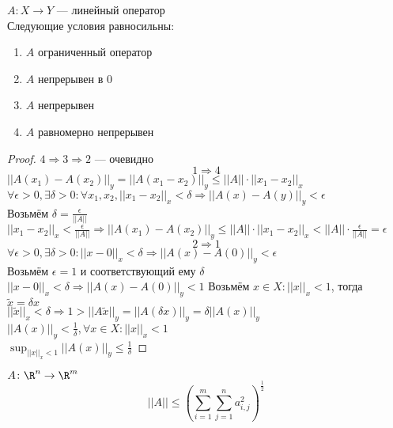 \begin{theorem}
$A \colon X \rightarrow Y$ --- линейный оператор\\
Следующие условия равносильны:
\begin{enumerate}
\item $A$ ограниченный оператор
\item $A$ непрерывен в 0
\item $A$ непрерывен
\item $A$ равномерно непрерывен
\end{enumerate}
\end{theorem}
\begin{proof}
$4\Rightarrow 3 \Rightarrow 2$ --- очевидно\\
\[1 \Rightarrow 4\]
$||A(x_1) - A(x_2)||_y = ||A(x_1 - x_2)||_y \le ||A|| \cdot ||x_1 - x_2||_x$ \\
$\forall \epsilon > 0, \exists \delta > 0 \colon \forall x_1, x_2, ||x_1 - x_2||_x < \delta \Rightarrow ||A(x) - A(y)||_y < \epsilon$ \\
Возьмём $\delta = \frac{\epsilon}{||A||} $\\
$||x_1 - x_2||_x < \frac{\epsilon}{||A||} \Rightarrow ||A(x_1) - A(x_2)||_y \le ||A|| \cdot ||x_1 - x_2||_x < ||A|| \cdot \frac{\epsilon}{||A||} = \epsilon$
\[2 \Rightarrow 1\]
$\forall \epsilon > 0, \exists \delta > 0 \colon ||x - 0||_x < \delta \Rightarrow ||A(x) - A(0)||_y < \epsilon$ \\
Возьмём $\epsilon = 1$ и соответствующий ему $\delta$\\
$||x - 0||_x < \delta \Rightarrow ||A(x) - A(0)||_y < 1$
Возьмём $x\in X \colon ||x||_x < 1$, тогда \\
$\widetilde{x} = \delta x$\\
$||\widetilde{x}||_x < \delta \Rightarrow 1 > ||A \widetilde{x}||_y = ||A(\delta x)||_y = \delta ||A(x)||_y$\\
$||A(x)||_y < \frac{1}{\delta}, \forall x \in X \colon ||x||_x < 1$\\
$\sup_{||x||_x < 1} ||A(x)||_y \le \frac{1}{\delta}$
\end{proof}
\begin{theorem}
$A \colon \R^n \rightarrow \R^m$\\
\[||A|| \le (\sum_{i = 1}^m \sum_{j = 1}^n a_{i, j}^2)^{\frac{1}{2}}\]
\end{theorem}
